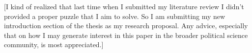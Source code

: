 \documentclass[hyphens, crop=false]{standalone}
\begin{document}
	
	


	[I kind of realized that last time when I submitted my literature review
	I didn't provided a proper puzzle that I aim to solve.
	So I am submitting my new introduction section of the thesis as my research proposal.
	Any advice, especially that on how I may generate interest in this paper in the broader political science community,
	is most appreciated.]
	
\end{document}
